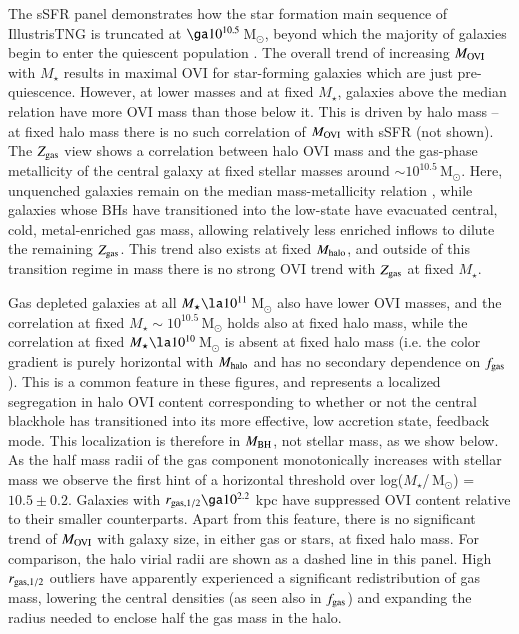 \documentclass[useAMS,usenatbib]{mnras}
\newcommand{\msun}{\,M$_{\odot}$\xspace}
\newcommand{\ovi}{OVI\xspace}
\begin{document}
The sSFR panel demonstrates how the star formation main sequence of IllustrisTNG is truncated at $\ga 10^{10.5}$\msun, beyond which the majority of galaxies begin to enter the quiescent population \citep{weinberger18}. The overall trend of increasing $M_{\rm OVI}$ with $M_\star$ results in maximal \ovi for star-forming galaxies which are just pre-quiescence. However, at lower masses and at fixed $M_\star$, galaxies above the median relation have more \ovi mass than those below it. This is driven by halo mass -- at fixed halo mass there is no such correlation of $M_{\rm OVI}$ with sSFR (not shown).
The $Z_{\rm gas}$ view shows a correlation between halo \ovi mass and the gas-phase metallicity of the central galaxy at fixed stellar masses around $\sim 10^{10.5}$\msun. Here, unquenched galaxies remain on the median mass-metallicity relation \citep[MZR; explored for TNG in][]{torrey18}, while galaxies whose BHs have transitioned into the low-state have evacuated central, cold, metal-enriched gas mass, allowing relatively less enriched inflows to dilute the remaining $Z_{\rm gas}$. This trend also exists at fixed $M_{\rm halo}$, and outside of this transition regime in mass there is no strong \ovi trend with $Z_{\rm gas}$ at fixed $M_\star$. 

Gas depleted galaxies at all $M_\star \la 10^{11}$\msun also have lower \ovi masses, and the correlation at fixed $M_\star \sim 10^{10.5}$\msun holds also at fixed halo mass, while the correlation at fixed $M_\star \la 10^{10}$\msun is absent at fixed halo mass (i.e. the color gradient is purely horizontal with $M_{\rm halo}$ and has no secondary dependence on $f_{\rm gas}$). This is a common feature in these figures, and represents a localized segregation in halo \ovi content corresponding to whether or not the central blackhole has transitioned into its more effective, low accretion state, feedback mode. This localization is therefore in $M_{\rm BH}$, not stellar mass, as we show below.
As the half mass radii of the gas component monotonically increases with stellar mass we observe the first hint of a horizontal threshold over log($M_\star$/\msun) = $10.5 \pm 0.2$. Galaxies with $r_{\rm gas,1/2} \ga 10^{2.2}$ kpc have suppressed \ovi content relative to their smaller counterparts. Apart from this feature, there is no significant trend of $M_{\rm OVI}$ with galaxy size, in either gas or stars, at fixed halo mass. For comparison, the halo virial radii are shown as a dashed line in this panel. High $r_{\rm gas,1/2}$ outliers have apparently experienced a significant redistribution of gas mass, lowering the central densities (as seen also in $f_{\rm gas}$) and expanding the radius needed to enclose half the gas mass in the halo. 
\end{document}

